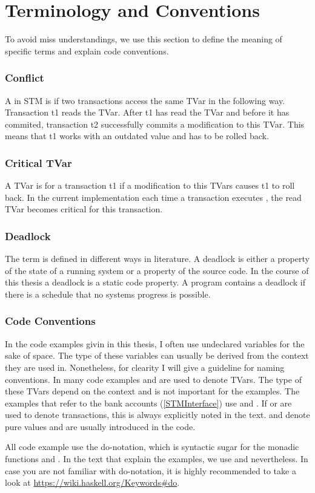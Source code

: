 \section{Terminology and Conventions}
To avoid miss understandings, we use this section to define the meaning of specific terms and explain code conventions.

\subsubsection{Conflict}
A  in STM is if two transactions access the same TVar in the following way. Transaction t1 reads 
the TVar. After t1 has read the TVar and before it has commited, transaction t2 successfully commits a modification 
to this TVar. This means that t1 works with an outdated value and has to be rolled back. 

\subsubsection{Critical TVar}
A TVar is  for a transaction t1 if a modification to this TVars causes t1 to roll back. In the current
implementation each time a transaction executes , the read TVar becomes critical for this transaction. 

\subsubsection{Deadlock}
The term  is defined in different ways in literature. A deadlock is either a property
of the state of a running system or a property of the source code. In the course of this thesis a deadlock
is a static code property. A program contains a deadlock if there is a schedule that no systems progress is
possible. 

\subsubsection{Code Conventions}
In the code examples givin in this thesis, I often use undeclared variables for the sake of space.
The type of these variables can usually be derived from the context they are used in. Nonetheless, for 
clearity I will give a guideline for naming conventions. In many code examples  and  
are used to denote TVars. The type of these TVars depend on the context and is not important for the
examples. The examples that refer to the bank accounts (\ref{STMInterface}) use  and 
. If  or  are used to denote transactions, this is always explicitly 
noted in the text.  and  denote pure values and are usually introduced in the code.

All code example use the do-notation, which is syntactic sugar for the monadic functions \code{>>=} and 
\code{>>}. In the text that explain the examples, we use \code{>>=} and \code{>>} nevertheless.
In case you are not familiar with do-notation, it is highly recommended to take a look at 
\url{https://wiki.haskell.org/Keywords#do}.
